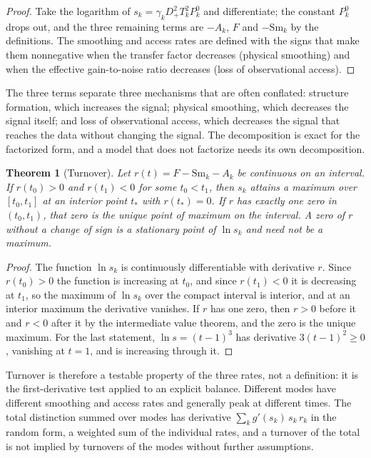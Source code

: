 \documentclass[11pt,oneside]{book}
\newtheorem{theorem}{Theorem}[chapter]
\theoremstyle{definition}
\theoremstyle{remark}
\begin{document}
\begin{proof}
Take the logarithm of $s_k=\gamma_kD_+^2T_k^2P_k^0$ and differentiate; the constant $P_k^0$ drops out, and the three remaining terms are $-A_k$, $F$ and $-\mathrm{Sm}_k$ by the definitions. The smoothing and access rates are defined with the signs that make them nonnegative when the transfer factor decreases (physical smoothing) and when the effective gain-to-noise ratio decreases (loss of observational access).
\end{proof}

The three terms separate three mechanisms that are often conflated: structure formation, which increases the signal; physical smoothing, which decreases the signal itself; and loss of observational access, which decreases the signal that reaches the data without changing the signal. The decomposition is exact for the factorized form, and a model that does not factorize needs its own decomposition.

\begin{theorem}[Turnover]\label{thm:turnover}
Let $r(t)=F-\mathrm{Sm}_k-A_k$ be continuous on an interval. If $r(t_0)>0$ and $r(t_1)<0$ for some $t_0<t_1$, then $s_k$ attains a maximum over $[t_0,t_1]$ at an interior point $t_*$ with $r(t_*)=0$. If $r$ has exactly one zero in $(t_0,t_1)$, that zero is the unique point of maximum on the interval. A zero of $r$ without a change of sign is a stationary point of $\ln s_k$ and need not be a maximum.
\end{theorem}

\begin{proof}
The function $\ln s_k$ is continuously differentiable with derivative $r$. Since $r(t_0)>0$ the function is increasing at $t_0$, and since $r(t_1)<0$ it is decreasing at $t_1$, so the maximum of $\ln s_k$ over the compact interval is interior, and at an interior maximum the derivative vanishes. If $r$ has one zero, then $r>0$ before it and $r<0$ after it by the intermediate value theorem, and the zero is the unique maximum. For the last statement, $\ln s=(t-1)^3$ has derivative $3(t-1)^2\geq0$, vanishing at $t=1$, and is increasing through it.
\end{proof}

Turnover is therefore a testable property of the three rates, not a definition: it is the first-derivative test applied to an explicit balance. Different modes have different smoothing and access rates and generally peak at different times. The total distinction summed over modes has derivative $\sum_kg'(s_k)\,s_k\,r_k$ in the random form, a weighted sum of the individual rates, and a turnover of the total is not implied by turnovers of the modes without further assumptions.
\end{document}
